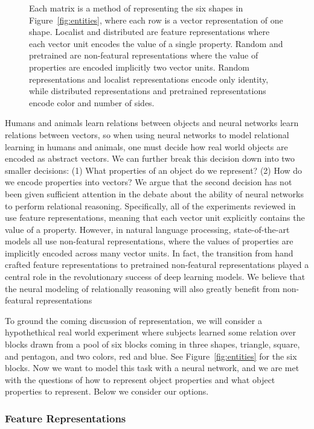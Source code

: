 \documentclass{article}
\newcommand{\figref}[1]{Figure~\ref{#1}}
\newcommand{\updatea}[1]{{\color{darkred}#1}}
\begin{document}
{\begin{figure}[t!]
  \caption{\updatea{Each matrix is a method of representing the six shapes in \figref{fig:entities}, where each row is a vector representation of one shape. Localist and distributed are feature representations where each vector unit encodes the value of a single property. Random and pretrained are non-featural representations where the value of properties are encoded implicitly two vector units. Random representations and localist representations encode only identity, while distributed representations and pretrained representations encode color and number of sides.}}
  \label{fig:reps}
\end{figure}

Humans and animals learn relations between objects and neural networks learn relations between vectors, so when using neural networks to model relational learning in humans and animals, one must decide how real world objects are encoded as abstract vectors. We can further break this decision down into two smaller decisions: (1) What properties of an object do we represent?  (2) How do we encode properties into vectors? We argue that the second decision has not been given sufficient attention in the debate about the ability of neural networks to perform relational reasoning. Specifically, all of the experiments reviewed in \citep{alhama:2019} use feature representations, meaning that each vector unit explicitly contains the value of a property. However, in natural language processing, state-of-the-art models all use non-featural representations, where the values of properties are implicitly encoded across many vector units. In fact, the transition from hand crafted feature representations to pretrained non-featural representations played a central role in the revolutionary success of deep learning models. We believe that the neural modeling of relationally reasoning will also greatly benefit from non-featural representations

To ground the coming discussion of representation, we will consider a hypothethical real world experiment where subjects learned some relation over blocks drawn from a pool of six blocks coming in three shapes, triangle, square, and pentagon, and two colors, red and blue. See \figref{fig:entities} for the six blocks. Now we want to model this task with a neural network, and we are met with the questions of how to represent object properties and what object properties to represent. Below we consider our options.

\subsubsection{Feature Representations}

}
\end{document}
